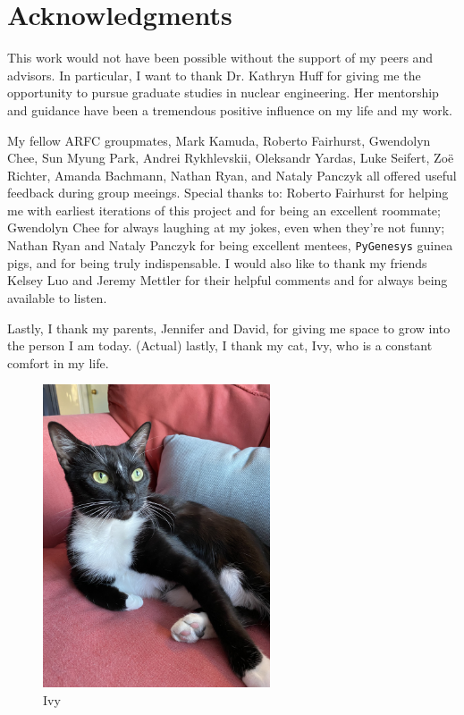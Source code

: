 \documentclass[edeposit,fullpage,11pt]{uiucthesis2018}
\begin{document}
\chapter*{Acknowledgments}

This work would not have been possible without the support of my peers and
advisors. In particular, I want to thank Dr. Kathryn Huff for giving me the
opportunity to pursue graduate studies in nuclear engineering. Her mentorship and
guidance have been a tremendous positive influence on my life and my work.

My fellow ARFC groupmates, Mark Kamuda, Roberto Fairhurst, Gwendolyn Chee,
Sun Myung Park, Andrei Rykhlevskii, Oleksandr Yardas, Luke Seifert, Zo\"e Richter,
Amanda Bachmann, Nathan Ryan, and Nataly Panczyk all offered useful feedback
during group meeings. Special thanks to: Roberto Fairhurst for helping me with
earliest iterations of this project and for being an excellent roommate; Gwendolyn
Chee for always laughing at my jokes, even when they're not funny; Nathan Ryan
and Nataly Panczyk for being excellent mentees, \texttt{PyGenesys} guinea pigs,
and for being truly indispensable.
I would also like to thank my friends Kelsey Luo and Jeremy Mettler for their
helpful comments and for always being available to listen.

Lastly, I thank my parents, Jennifer and David, for giving me space to grow
into the person I am today. (Actual) lastly, I thank my cat, Ivy, who is a
constant comfort in my life.

\begin{figure}[H]
  \centering
  \includegraphics[width=0.6\textwidth]{figures/ivy}
  \caption{Ivy}
  \label{fig:ivy}
\end{figure}
\end{document}

